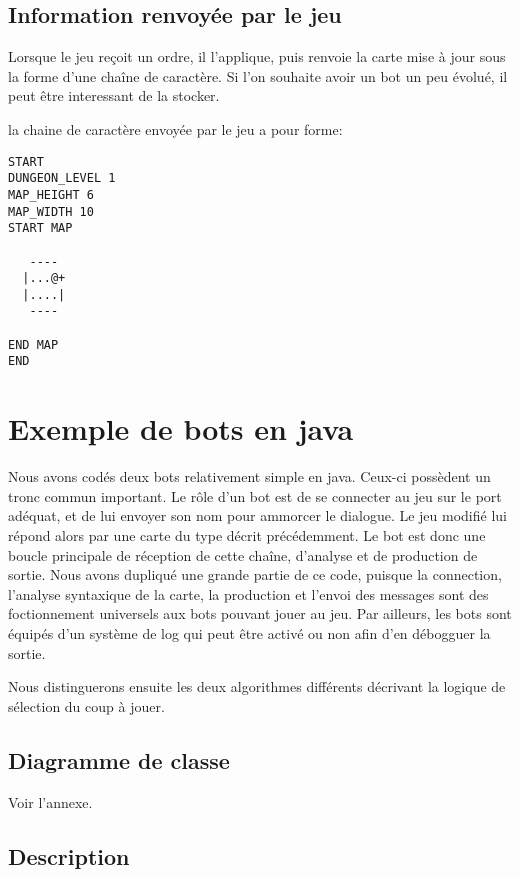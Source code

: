 \subsection{Information renvoyée par le jeu}
Lorsque le jeu reçoit un ordre, il l'applique, puis renvoie la carte mise à jour sous la forme d'une chaîne de caractère. Si l'on souhaite avoir un bot un peu évolué, il peut être interessant de la stocker. 

la chaine de caractère envoyée par le jeu a pour forme:

\begin{verbatim}
START
DUNGEON_LEVEL 1
MAP_HEIGHT 6
MAP_WIDTH 10
START MAP
          
   ----   
  |...@+  
  |....|  
   ----   
          
END MAP
END
\end{verbatim}



\section{Exemple de bots en java}

Nous avons codés deux bots relativement simple en java. Ceux-ci possèdent un tronc commun important. 
Le rôle d'un bot est de se connecter au jeu sur le port adéquat, et de lui envoyer son nom pour ammorcer le dialogue. Le jeu modifié lui répond alors par une carte du type décrit précédemment. Le bot est donc une boucle principale de réception de cette chaîne, d'analyse et de production de sortie. Nous avons dupliqué une grande partie de ce code, puisque la connection, l'analyse syntaxique de la carte, la production et l'envoi des messages sont des foctionnement universels aux bots pouvant jouer au jeu. Par ailleurs, les bots sont équipés d'un système de log qui peut être activé ou non afin d'en débogguer la sortie. 

Nous distinguerons ensuite les deux algorithmes différents décrivant la logique de sélection du coup à jouer.

\subsection{Diagramme de classe}

Voir l'annexe.
 
\subsection{Description}

